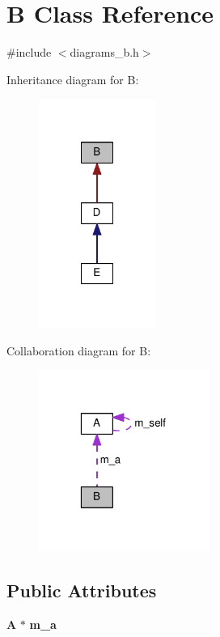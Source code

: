 \section{B Class Reference}
\label{class_b}


{\ttfamily \#include $<$diagrams\-\_\-b.\-h$>$}



Inheritance diagram for B\-:\nopagebreak
\begin{figure}[H]
\begin{center}
\leavevmode
\includegraphics[width=108pt]{class_b__inherit__graph}
\end{center}
\end{figure}


Collaboration diagram for B\-:\nopagebreak
\begin{figure}[H]
\begin{center}
\leavevmode
\includegraphics[width=159pt]{class_b__coll__graph}
\end{center}
\end{figure}
\subsection*{Public Attributes}
\begin{DoxyCompactItemize}
\item 
{\bf A} $\ast$ {\bf m\-\_\-a}
\end{DoxyCompactItemize}


